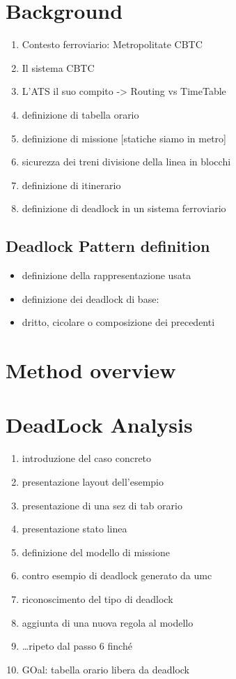 \documentclass{ewic}
\begin{document}
\section{Background}
%
\begin{enumerate}
\item Contesto ferroviario: Metropolitate CBTC
\item Il sistema CBTC
\item L'ATS il suo compito -> Routing vs TimeTable
\item definizione di tabella orario 
\item definizione di missione [statiche siamo in metro]
\item sicurezza dei treni divisione della linea in blocchi
\item definizione di itinerario 
\item definizione di deadlock in un sistema ferroviario
\end{enumerate}



\subsection{Deadlock Pattern definition}
\begin{itemize}
\item definizione della rappresentazione usata
\item definizione dei deadlock di base:
\item dritto, cicolare o composizione dei precedenti
\end{itemize}

\section{Method overview}


\section{DeadLock Analysis}
\begin{enumerate}
\item introduzione del caso concreto
\item presentazione layout dell'esempio
\item presentazione di una sez di tab orario
\item presentazione stato linea
\item definizione del modello di missione
\item contro esempio di deadlock generato da umc
\item riconoscimento del tipo di deadlock
\item aggiunta di una nuova regola al modello
\item \ldots ripeto dal passo 6 finch\'{e}
\item GOal: tabella orario libera da deadlock
\end{enumerate}
%
\end{document}
